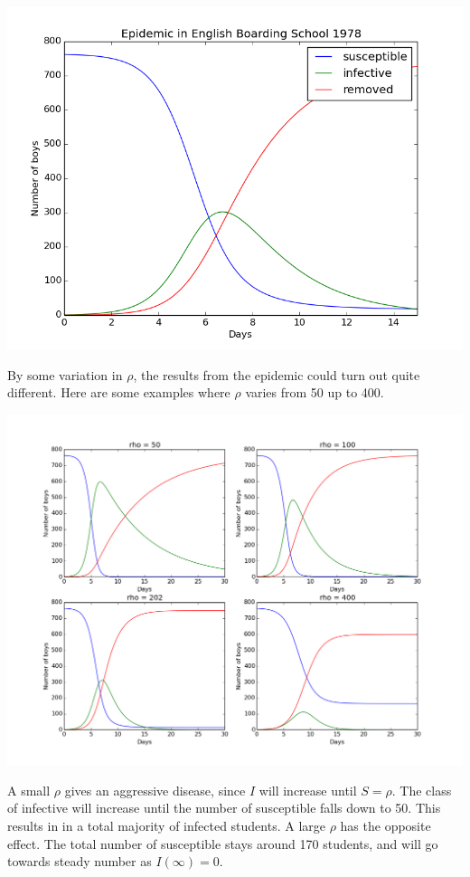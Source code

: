 \documentclass[%
twoside,                 %
final,                   %
10pt]{article}
\begin{document}
\begin{center}  %
  \centerline{\includegraphics[width=0.9\linewidth]{plots/English_boarding_school.png}}
\end{center}


By some variation in $\rho$, the results from the epidemic could turn out quite different. Here are some examples where $\rho$ varies from 50 up to 400.


\begin{center}  %
  \centerline{\includegraphics[width=0.9\linewidth]{plots/English_boarding_school_changes.png}}
\end{center}


A small $\rho$ gives an aggressive disease, since $I$ will increase until $S= \rho$. The class of infective will increase until the number of susceptible falls down to 50. This results in in a total majority of infected students. A large $\rho$ has the opposite effect. The total number of susceptible stays around 170 students, and will go towards steady number as $I(\infty)=0$.   
\end{document}
